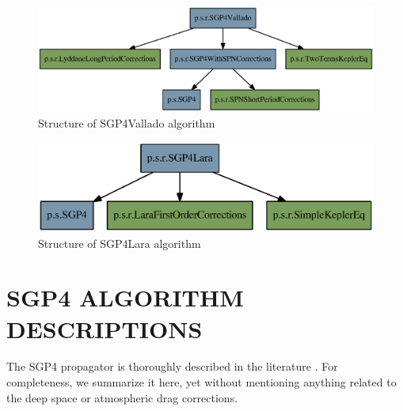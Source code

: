 \documentclass{article}
\begin{document}
\begin{figure}[!htbp]
  \centering
	\includegraphics[width=\linewidth]{vallado.eps}
\caption{Structure of SGP4Vallado algorithm}
\label{fig:valladoeps}
\end{figure}

\begin{figure}[!htbp]
  \centering
	\includegraphics[width=\linewidth]{lara.eps}
\caption{Structure of SGP4Lara algorithm}
\label{fig:laraeps}
\end{figure}



\section{SGP4 ALGORITHM DESCRIPTIONS}
\label{sec:algorithms}

The SGP4 propagator is thoroughly described in the literature \cite{HootsRoehrich1980,ValladoCrawfordHujsakKelso2006}. For completeness, we summarize it here, yet without mentioning anything related to the deep space or atmospheric drag corrections.
\end{document}
